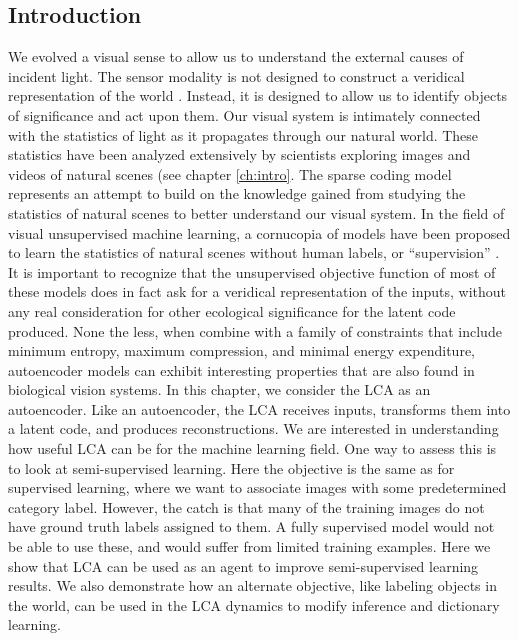 \subsection{Introduction}
We evolved a visual sense to allow us to understand the external causes of incident light. The sensor modality is not designed to construct a veridical representation of the world \parencite{gollisch2010eye}. Instead, it is designed to allow us to identify objects of significance and act upon them. Our visual system is intimately connected with the statistics of light as it propagates through our natural world. These statistics have been analyzed extensively by scientists exploring images and videos of natural scenes (see chapter \ref{ch:intro}. The sparse coding model represents an attempt to build on the knowledge gained from studying the statistics of natural scenes to better understand our visual system. In the field of visual unsupervised machine learning, a cornucopia of models have been proposed to learn the statistics of natural scenes without human labels, or ``supervision'' \parencite{baldi2012autoencoders, bengio2012unsupervised, goodfellow2016deep}. It is important to recognize that the unsupervised objective function of most of these models does in fact ask for a veridical representation of the inputs, without any real consideration for other ecological significance for the latent code produced. None the less, when combine with a family of constraints that include minimum entropy, maximum compression, and minimal energy expenditure, autoencoder models can exhibit interesting properties that are also found in biological vision systems. In this chapter, we consider the LCA as an autoencoder. Like an autoencoder, the LCA receives inputs, transforms them into a latent code, and produces reconstructions. We are interested in understanding how useful LCA can be for the machine learning field. One way to assess this is to look at semi-supervised learning. Here the objective is the same as for supervised learning, where we want to associate images with some predetermined category label. However, the catch is that many of the training images do not have ground truth labels assigned to them. A fully supervised model would not be able to use these, and would suffer from limited training examples. Here we show that LCA can be used as an agent to improve semi-supervised learning results. We also demonstrate how an alternate objective, like labeling objects in the world, can be used in the LCA dynamics to modify inference and dictionary learning.

